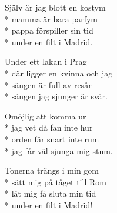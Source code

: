 \begin{SongText}
\begin{SongVerse}
        Själv är jag blott en kostym\\*%
        mamma är bara parfym\\*%
        pappa förspiller sin tid\\*%
        under en filt i Madrid.
    \end{SongVerse}
    \begin{SongVerse}
        Under ett lakan i Prag\\*%
        där ligger en kvinna och jag\\*%
        sängen är full av resår\\*%
        sången jag sjunger är svår.
    \end{SongVerse}
    \begin{SongVerse}
        Omöjlig att komma ur\\*%
        jag vet då fan inte hur\\*%
        orden får snart inte rum\\*%
        jag får väl sjunga mig stum.
    \end{SongVerse}
    \begin{SongVerse}
        Tonerna trängs i min gom\\*%
        sätt mig på tåget till Rom\\*%
        låt mig få sluta min tid\\*%
        under en filt i Madrid!
    \end{SongVerse}
\end{SongText}
